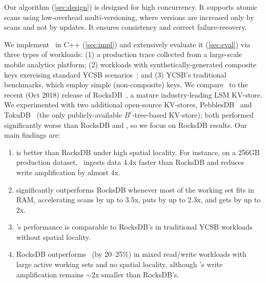 Our algorithm (\cref{sec:design}) is designed for high concurrency. 
It supports atomic scans using low-overhead multi-versioning, where versions are increased only by scans and not by updates. 
It ensures consistency and correct failure-recovery. 

We implement \sys\ in  C++ (\cref{sec:impl}) and extensively evaluate it (\cref{sec:eval})
via three types of workloads: (1) a production trace collected from a large-scale mobile analytics platform; 
(2)  workloads with synthetically-generated composite keys exercising  standard YCSB scenarios~\cite{YCSB};
and (3)  YCSB's traditional benchmarks, which employ simple (non-composite) keys.  
We compare \sys\ to the recent (Oct 2018) release of RocksDB~\cite{RocksDB}, a mature industry-leading LSM KV-store. 
We  experimented with two additional open-source KV-stores, PebblesDB~\cite{PebblesDB}  and  
TokuDB~\cite{TokuDB} (the only publicly-available $B^{\epsilon}$-tree-based 
KV-store); both performed significantly worse than  RocksDB and \sys, so we focus on RocksDB results. 
Our main findings are: 
\begin{enumerate} 
\item \sys\/ is  better than RocksDB under high spatial  locality.  
For instance, on a 256GB production dataset, \sys\ ingests data 4.4x faster than RocksDB %
and reduces write amplification by almost 4x. 
\item \sys\/ significantly outperforms RocksDB whenever most of the working set fits in RAM, 
accelerating scans by up to $3.5$x, puts by up to $2.3$x, and gets by up to $2$x. 
\item \sys's performance is  comparable to RocksDB's in traditional YCSB workloads without spatial locality.
\item RocksDB outperforms \sys\ (by 20--25\%)  in mixed read/write workloads with large active working sets and no spatial locality, 
although \sys's write amplification remains $\sim$2x smaller than RocksDB's. 
\end{enumerate}


